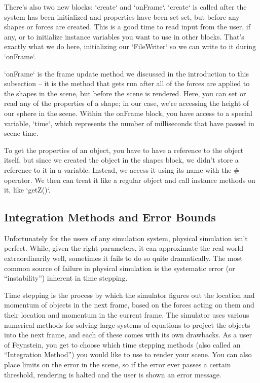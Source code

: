 There's also two new blocks: `create` and `onFrame`. `create` is
called after the system has been initialized and properties have been
set set, but before any shapes or forces are created. This is a good
time to read input from the user, if any, or to initialize instance
variables you want to use in other blocks. That's exactly what we do
here, initializing our `FileWriter` so we can write to it during
`onFrame`.

`onFrame` is the frame update method we discussed in the introduction
to this subsection -- it is the method that gets run after all of the
forces are applied to the shapes in the scene, but before the scene is
rendered. Here, you can set or read any of the properties of a shape;
in our case, we're accessing the height of our sphere in the
scene. Within the onFrame block, you have access to a special
variable, `time`, which represents the number of milliseconds that
have passed in scene time.

To get the properties of an object, you have to have a reference to
the object itself, but since we created the object in the shapes
block, we didn't store a reference to it in a variable. Instead, we
access it using its name with the \#-operator. We then can treat it
like a regular object and call instance methods on it, like `getZ()`.

\subsection{Integration Methods and Error Bounds}

Unfortunately for the users of any simulation system, physical
simulation isn't perfect. While, given the right parameters, it can
approximate the real world extraordinarily well, sometimes it fails to
do so quite dramatically. The most common source of failure in
physical simulation is the systematic error (or “instability”)
inherent in time stepping.

Time stepping is the process by which the simulator figures out the
location and momentum of objects in the next frame, based on the
forces acting on them and their location and momentum in the current
frame. The simulator uses various numerical methods for solving large
systems of equations to project the objects into the next frame, and
each of these comes with its own drawbacks. As a user of Feynstein,
you get to choose which time stepping methods (also called an
“Integration Method”) you would like to use to render your scene. You
can also place limits on the error in the scene, so if the error ever
passes a certain threshold, rendering is halted and the user is shown
an error message.

